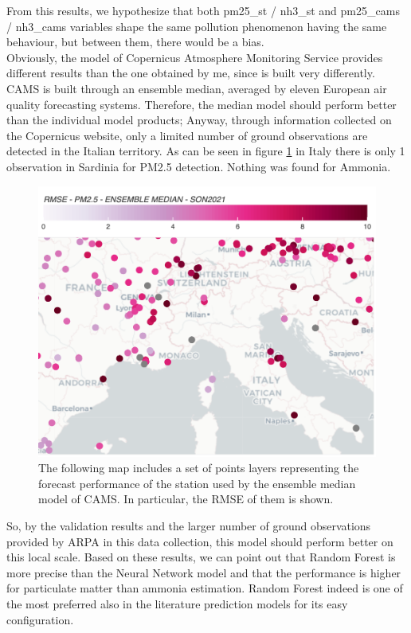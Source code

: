 From this results, we hypothesize that both pm25\_st / nh3\_st and pm25\_cams / nh3\_cams variables shape the same pollution phenomenon having the same behaviour, but between them, there would be a bias.\\
Obviously, the model of Copernicus Atmosphere Monitoring Service provides different results than the one obtained by me, since is built very differently. CAMS is built through an ensemble median, averaged by eleven European air quality forecasting systems. Therefore, the median model should perform better than the individual model products\cite{riccio2007seeking}; 
Anyway, through information collected on the Copernicus website, only a limited number of ground observations are detected in the Italian territory. As can be seen in figure \ref{fig:cams} in Italy there is only 1 observation in Sardinia for PM2.5 detection. Nothing was found for Ammonia.
\begin{figure}[H]
    \centering
    \includegraphics[scale=0.2]{images/cams_obs.png}
    \caption{The following map includes a set of points layers representing the forecast performance of the station used by the ensemble median model of CAMS. In particular, the RMSE of them is shown\cite{camsobs}. 
}
    \label{fig:cams}
\end{figure}

So, by the validation results and the larger number of ground observations provided by ARPA in this data collection, this model should perform better on this local scale.
\bigbreak
Based on these results, we can point out that Random Forest is more precise than the  Neural Network model and that the performance is higher for particulate matter than ammonia estimation.
Random Forest indeed is one of the most preferred also in the  literature prediction models for its easy configuration.
